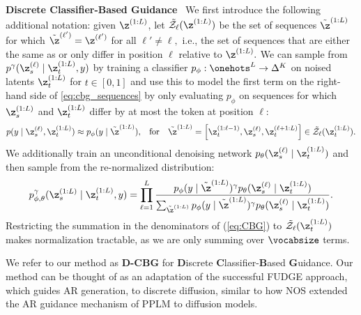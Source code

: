\documentclass{article} %
\begin{document}
\textbf{Discrete Classifier-Based Guidance}~
We first introduce the following additional notation: given $\z^{(1:L)}$, let $\Tilde{\mathcal{Z}}_\ell(\z^{(1:L)})$ be the set of sequences $\Tilde{\z}^{(1:L)}$ for which $\Tilde{\z}^{(\ell')} = \z^{(\ell')}$ for all $\ell' \neq \ell,$ i.e., the set of sequences that are either the same as or only differ in position $\ell$ relative to $\z^{(1:L)}.$
We can sample from $p^\gamma(\z_s^{(\ell)} \mid \z_t^{(1:L)}, y)$ by training a classifier $p_\phi: \onehots^L \rightarrow \Delta^K$ on noised latents $\z_t^{(1:L)}$ for $t \in [0, 1]$ and use this to model the first term on the right-hand side of \eqref{eq:cbg_sequences} by only evaluating $p_\phi$ on sequences for which $\z_s^{(1:L)}$ and $\z_t^{(1:L)}$ differ by at most the token at position $\ell$:
\begin{align*}
    p(y \mid \z_s^{(\ell)}, \z_t^{(1:L)}) \approx p_\phi(y \mid \Tilde{\z}^{(1:L)}), &&
    \text{for ~~}\Tilde{\z}^{(1:L)} = \Big[\z_t^{(1:\ell-1)}, \z_s^{(\ell)}, \z_t^{(\ell+1:L)}\Big] \in \Tilde{\mathcal{Z}}_\ell(\z_t^{(1:L)}).
\end{align*}
We additionally train an unconditional denoising network $p_\theta(\z_s^{(\ell)} \mid \z_t^{(1:L)})$ and then sample from the re-normalized distribution:
\begin{align}\label{eq:CBG}
    p^\gamma_{\phi, \theta}(\z_s^{(1:L)} \mid \z_t^{(1:L)}, y) = \prod_{\ell=1}^{L}\frac{p_\phi(y \mid \Tilde{\z}^{(1:L)})^\gamma p_\theta(\z_s^{(\ell)} \mid \z_t^{(1:L)})}{\sum_{\Tilde{\z}^{(1:L)}}p_\phi(y \mid \Tilde{\z}^{(1:L)})^\gamma p_\theta(\z_s^{(\ell)} \mid \z_t^{(1:L)})}.
\end{align}
Restricting the summation in the denominators of (\ref{eq:CBG}) to $\Tilde{\mathcal{Z}}_\ell(\z_t^{(1:L)})$ makes normalization tractable, as we are only summing over $\vocabsize$ terms.

We refer to our method as \textbf{D-CBG} for \textbf{D}iscrete \textbf{C}lassifier-\textbf{B}ased \textbf{G}uidance.
Our method can be thought of as an adaptation of the successful FUDGE \citep{yang2021fudge} approach, which guides AR generation, to discrete diffusion, similar to how NOS \citep{gruver2024protein} extended the AR guidance mechanism of PPLM \citep{dathathri2019plug} to diffusion models.
\end{document}
